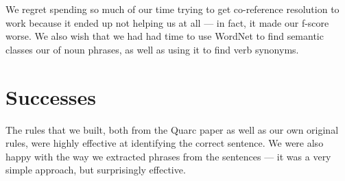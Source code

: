 \documentclass[twoside,12pt]{article}
\begin{document}
We regret spending so much of our time trying to get co-reference resolution to work because it ended up not helping us at all --- in fact, it made our f-score worse. We also wish that we had had time to use WordNet to find semantic classes our of noun phrases, as well as using it to find verb synonyms.

\section{Successes}

The rules that we built, both from the Quarc paper as well as our own original rules, were highly effective at identifying the correct sentence. We were also happy with the way we extracted phrases from the sentences --- it was a very simple approach, but surprisingly effective.
\end{document}
